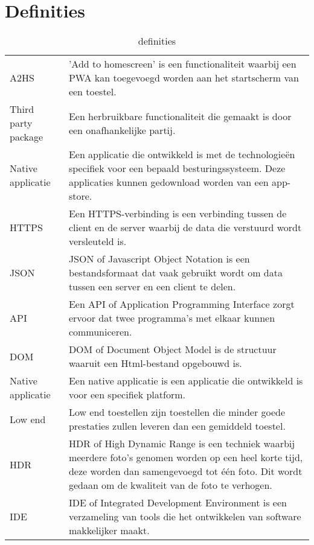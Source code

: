 \chapter*{Definities}
\begin{table}[H]
	\begin{tabular}{p{3cm}p{10cm}}
		A2HS & 'Add to homescreen' is een functionaliteit waarbij een PWA kan toegevoegd worden aan het startscherm van een toestel.\\
		Third party package & Een herbruikbare functionaliteit die gemaakt is door een onafhankelijke partij.\\
		Native applicatie & Een applicatie die ontwikkeld is met de technologieën specifiek voor een bepaald besturingssysteem. Deze applicaties kunnen gedownload worden van een app-store.\\
		HTTPS & Een HTTPS-verbinding is een verbinding tussen de client en de server waarbij de data die verstuurd wordt versleuteld is. \\
		JSON &  JSON of Javascript Object Notation is een bestandsformaat dat vaak gebruikt wordt om data tussen een server en een client te delen. \\
		API &  Een API of Application Programming Interface zorgt ervoor dat twee programma’s met elkaar kunnen communiceren.\\
		DOM & DOM of Document Object Model is de structuur waaruit een Html-bestand opgebouwd is. \\
		Native applicatie &  Een native applicatie is een applicatie die ontwikkeld is voor een specifiek platform.\\
		Low end & Low end toestellen zijn toestellen die minder goede prestaties zullen leveren dan een gemiddeld toestel. \\
		HDR & HDR of High Dynamic Range is een techniek waarbij meerdere foto’s genomen worden op een heel korte tijd, deze worden dan samengevoegd tot één foto. Dit wordt gedaan om de kwaliteit van de foto te verhogen. \\
		IDE & IDE of Integrated Development Environment is een verzameling van tools die het ontwikkelen van software makkelijker maakt.
	\end{tabular}	
	\caption{definities }
\end{table}
\newpage
